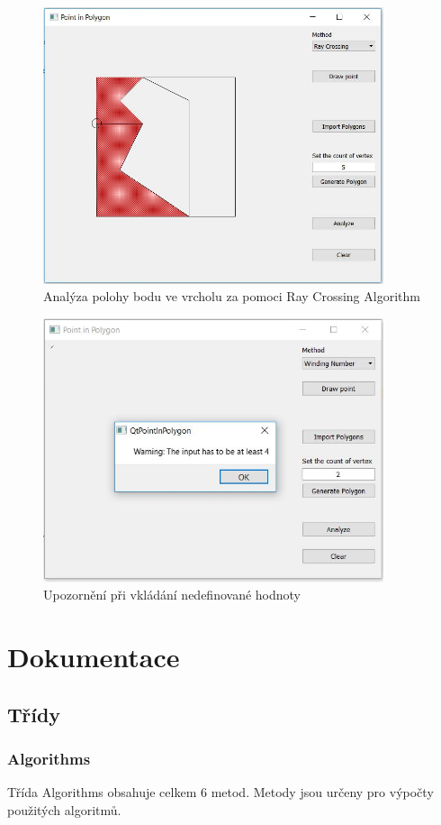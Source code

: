 \documentclass[a4paper, 12pt]{article}
\begin{document}
\begin{figure}[h!]
	\centering
	\includegraphics[width=10cm]{ray_vertex.jpg}
	\caption{Analýza polohy bodu ve vrcholu za pomoci Ray Crossing Algorithm}
\end{figure}

\begin{figure}[h!]
	\centering
	\includegraphics[width=10cm]{warning.jpg}
	\caption{Upozornění při vkládání nedefinované hodnoty}
\end{figure}

\clearpage

\section{Dokumentace}
\subsection{Třídy}
\subsubsection{Algorithms}
Třída Algorithms obsahuje celkem 6 metod. Metody jsou určeny pro výpočty použitých algoritmů.
\\
\end{document}
